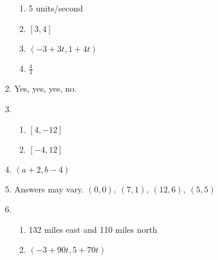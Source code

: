 \documentclass{article}
\begin{document}
\begin{enumerate}
\begin{enumerate}
	\item 5 units/second
	
	\item $[3, 4]$
	
	\item $(-3 + 3t, 1 + 4t)$
	
	\item $\frac{4}{3}$
	
	\end{enumerate}
	
\item Yes, yes, yes, no.

\item

	\begin{enumerate}
	
	\item $[4, -12]$
	
	\item $[-4, 12]$
	
	\end{enumerate}
	
\item $(a + 2, b - 4)$

\item Answers may vary. $(0,0), \ (7,1), \ (12, 6), \ (5, 5)$

\item

	\begin{enumerate}

	\item 132 miles east and 110 miles north
	
	\item $(-3 + 90t, 5 + 70t)$

	\end{enumerate}

\end{enumerate}
\end{document}
